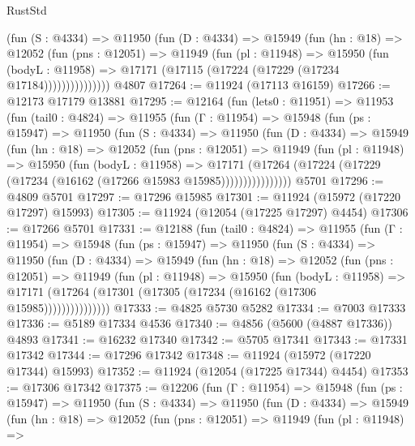 \begin{lexlean}{RustStd}
\begin{coremodule}
              (fun (S : @4334) =>
              @11950
                (fun (D : @4334) =>
                @15949
                  (fun (hn : @18) =>
                  @12052
                    (fun (pns : @12051) =>
                    @11949
                      (fun (pl : @11948) =>
                      @15950
                        (fun (bodyL : @11958) =>
                        @17171 (@17115 (@17224 (@17229 (@17234 @17184)))))))))))))))
    @4807
@17264 := @11924 (@17113 @16159)
@17266 := @12173 @17179 @13881
@17295 := @12164
    (fun (lets0 : @11951) =>
    @11953
      (fun (tail0 : @4824) =>
      @11955
        (fun (Γ : @11954) =>
        @15948
          (fun (ps : @15947) =>
          @11950
            (fun (S : @4334) =>
            @11950
              (fun (D : @4334) =>
              @15949
                (fun (hn : @18) =>
                @12052
                  (fun (pns : @12051) =>
                  @11949
                    (fun (pl : @11948) =>
                    @15950
                      (fun (bodyL : @11958) =>
                      @17171
                        (@17264
                          (@17224 (@17229 (@17234 (@16162 (@17266 @15983 @15985))))))))))))))))
    @5701
@17296 := @4809 @5701
@17297 := @17296 @15985
@17301 := @11924 (@15972 (@17220 @17297) @15993)
@17305 := @11924 (@12054 (@17225 @17297) @4454)
@17306 := @17266 @5701
@17331 := @12188
    (fun (tail0 : @4824) =>
    @11955
      (fun (Γ : @11954) =>
      @15948
        (fun (ps : @15947) =>
        @11950
          (fun (S : @4334) =>
          @11950
            (fun (D : @4334) =>
            @15949
              (fun (hn : @18) =>
              @12052
                (fun (pns : @12051) =>
                @11949
                  (fun (pl : @11948) =>
                  @15950
                    (fun (bodyL : @11958) =>
                    @17171 (@17264 (@17301 (@17305 (@17234 (@16162 (@17306 @15985)))))))))))))))
@17333 := @4825 @5730 @5282
@17334 := @7003 @17333
@17336 := @5189 @17334 @4536
@17340 := @4856 (@5600 (@4887 @17336)) @4893
@17341 := @16232 @17340
@17342 := @5705 @17341
@17343 := @17331 @17342
@17344 := @17296 @17342
@17348 := @11924 (@15972 (@17220 @17344) @15993)
@17352 := @11924 (@12054 (@17225 @17344) @4454)
@17353 := @17306 @17342
@17375 := @12206
    (fun (Γ : @11954) =>
    @15948
      (fun (ps : @15947) =>
      @11950
        (fun (S : @4334) =>
        @11950
          (fun (D : @4334) =>
          @15949
            (fun (hn : @18) =>
            @12052
              (fun (pns : @12051) =>
              @11949
                (fun (pl : @11948) =>

\end{coremodule}
\end{lexlean}
